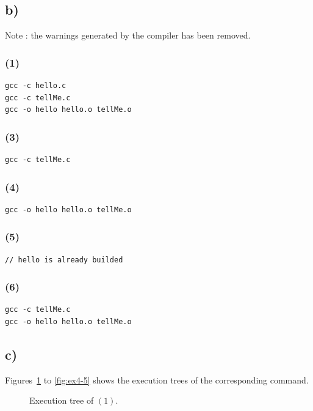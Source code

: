 \documentclass[a4paper,11pt]{report}
\begin{document}
\subsection*{b)}

Note : the warnings generated by the compiler has been removed.

\subsubsection*{(1)}
\begin{verbatim}
gcc -c hello.c
gcc -c tellMe.c
gcc -o hello hello.o tellMe.o
\end{verbatim}

\subsubsection*{(3)}
\begin{verbatim}
gcc -c tellMe.c
\end{verbatim}

\subsubsection*{(4)}
\begin{verbatim}
gcc -o hello hello.o tellMe.o
\end{verbatim}

\subsubsection*{(5)}
\begin{verbatim}
// hello is already builded
\end{verbatim}

\subsubsection*{(6)}
\begin{verbatim}
gcc -c tellMe.c
gcc -o hello hello.o tellMe.o
\end{verbatim}

\subsection*{c)}

Figures~\ref{fig:ex4-1} to \ref{fig:ex4-5} shows the execution trees of the
corresponding command.

\begin{figure}[ht]
  \centering
  \caption{\label{fig:ex4-1}Execution tree of $(1)$.}
\end{figure}
\end{document}
